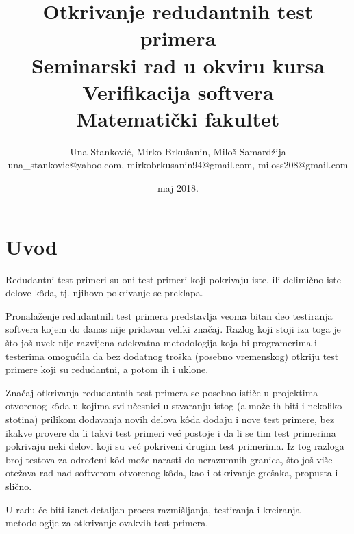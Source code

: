 \documentclass[a4paper]{article}
\begin{document}
\title{Otkrivanje redudantnih test primera\\ \small{Seminarski rad u okviru kursa\\Verifikacija softvera\\ Matematički fakultet}}

\author{Una Stanković, Mirko Brkušanin, Miloš Samardžija\\ una\_stankovic@yahoo.com, mirkobrkusanin94@gmail.com, miloss208@gmail.com}
\date{maj 2018.}
\maketitle


\tableofcontents
 
\newpage

\section{Uvod}
\label{sec:introduction}
Redudantni test primeri su oni test primeri koji pokrivaju iste, ili delimično iste delove kôda, tj. njihovo pokrivanje se preklapa.

Pronalaženje redudantnih test primera predstavlja veoma bitan deo testiranja softvera kojem do danas nije pridavan veliki značaj. Razlog koji stoji iza toga je što još uvek nije razvijena adekvatna metodologija koja bi programerima i testerima omogućila da bez dodatnog troška (posebno vremenskog) otkriju test primere koji su redudantni, a potom ih i uklone.

Značaj otkrivanja redudantnih test primera se posebno ističe u projektima otvorenog kôda u kojima svi učesnici u stvaranju istog (a može ih biti i nekoliko stotina) prilikom dodavanja novih delova kôda dodaju i nove test primere, bez ikakve provere da li takvi test primeri već postoje i da li se tim test primerima pokrivaju neki delovi koji su već pokriveni drugim test primerima. Iz tog razloga broj testova za određeni kôd može narasti do nerazumnih granica, što još više otežava rad nad softverom otvorenog kôda, kao i otkrivanje grešaka, propusta i slično. 

U radu će biti iznet detaljan proces razmišljanja, testiranja i kreiranja metodologije za otkrivanje ovakvih test primera.
\end{document}
